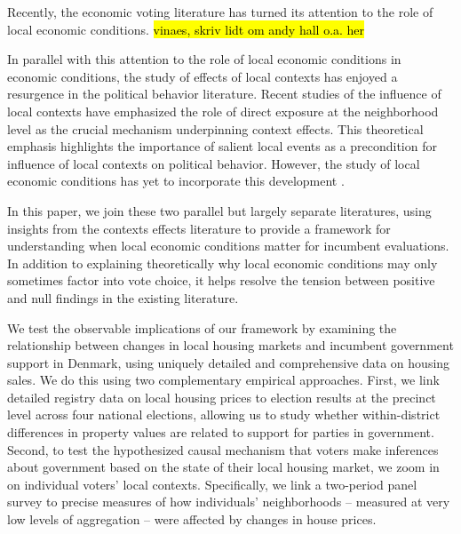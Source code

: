 \documentclass[12pt,a4paper]{article}
\begin{document}
	Recently, the economic voting literature has turned its attention to the role of local economic conditions. \hl{vinaes, skriv lidt om andy hall o.a. her}
	
	
	In parallel with this attention to the role of local economic conditions in economic conditions, the study of effects of local contexts has enjoyed a resurgence in the political behavior literature. Recent studies of the influence of local contexts have emphasized the role of direct exposure at the neighborhood level as the crucial mechanism underpinning context effects. This theoretical emphasis highlights the importance of salient local events as a precondition for influence of local contexts on political behavior. However, the study of local economic conditions has yet to incorporate this development \citep[though see][]{bisgaard2016reconsidering}.
	
	In this paper, we join these two parallel but largely separate literatures, using insights from the contexts effects literature to provide a framework for understanding when local economic conditions matter for incumbent evaluations. In addition to explaining theoretically why local economic conditions may only sometimes factor into vote choice, it helps resolve the tension between positive and null findings in the existing literature.
	
	We test the observable implications of our framework by examining the relationship between changes in local housing markets and incumbent government support in Denmark, using uniquely detailed and comprehensive data on housing sales. We do this using two complementary empirical approaches. First, we link detailed registry data on local housing prices to election results at the precinct level across four national elections, allowing us to study whether within-district differences in property values are related to support for parties in government. Second, to test the hypothesized causal mechanism that voters make inferences about government based on the state of their local housing market, we zoom in on individual voters' local contexts. Specifically, we link a two-period panel survey to precise measures of how individuals' neighborhoods -- measured at very low levels of aggregation -- were affected by changes in house prices.
	
\end{document}
